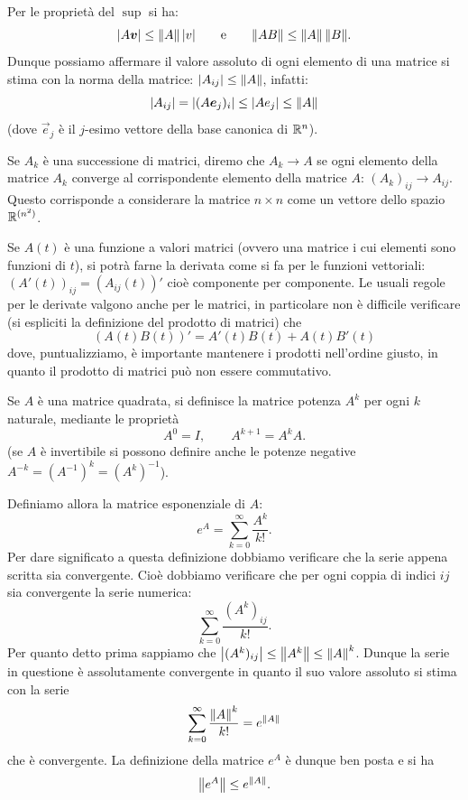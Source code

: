 Per le proprietà del $\sup$ si ha:
\[
  {\left|A\boldsymbol v\right|} \le {\left\Vert  A \right\Vert}\, {\left| v \right|}
\qquad\text{e}\qquad
  {\left\Vert  A B \right\Vert} \le {\left\Vert  A \right\Vert} \, {\left\Vert  B \right\Vert}.
\]
Dunque possiamo affermare il valore assoluto di ogni elemento di una
matrice si stima con la norma della matrice: ${\left| A_{ij}\right|} \le
{\left\Vert  A \right\Vert}$, infatti:
\[
  {\left| A_{ij} \right|} = {\left| (A \boldsymbol e_j)_i\right|} \le {\left| A e_j\right|}
  \le {\left\Vert  A \right\Vert}
\]
(dove $\vec e_j$ è il $j$-esimo vettore della base canonica di ${\mathbb R}^n$).

Se $A_k$ è una successione di matrici, diremo che $A_k\to A$ se ogni
elemento della matrice $A_k$ converge al corrispondente elemento della
matrice $A$: $(A_k)_{ij} \to A_{ij}$. Questo corrisponde a considerare
la matrice $n\times n$ come un vettore dello spazio ${\mathbb R}^{(n^2)}$.

Se $A(t)$ è una funzione a valori matrici (ovvero una matrice i cui
elementi sono funzioni di $t$), si potrà farne la derivata
come si fa per le funzioni vettoriali: $(A'(t))_{ij} = (A_{ij}(t))'$
cioè componente per componente. Le usuali regole per le derivate
valgono anche per le matrici, in particolare non è difficile
verificare (si espliciti la definizione del prodotto di matrici) che
\[
 (A(t)B(t))' = A'(t) B(t) + A(t) B'(t)
\]
dove, puntualizziamo, è importante mantenere i prodotti nell'ordine
giusto, in quanto il prodotto di matrici può non essere commutativo.

Se $A$ è una matrice quadrata, si definisce la matrice potenza $A^k$
per ogni $k$ naturale, mediante le proprietà
\[
  A^0 = I, \qquad A^{k+1} = A^kA.
\]
(se $A$ è invertibile si possono definire anche le potenze negative
$A^{-k}=(A^{-1})^k = (A^k)^{-1}$).

Definiamo allora la matrice esponenziale di $A$:
\[
  e^A = \sum_{k=0}^\infty \frac{A^k}{k!}.
\]
Per dare significato a questa definizione dobbiamo verificare che la
serie appena scritta sia convergente. Cioè dobbiamo verificare che per
ogni coppia di indici $ij$ sia convergente la serie numerica:
\[
 \sum_{k=0}^\infty \frac{(A^k)_{ij}}{k!}.
\]
Per quanto detto prima sappiamo che
${\left|(A^k)_{ij}\right|} \le {\left\Vert A^k\right\Vert} \le {\left\Vert A\right\Vert}^k$.
Dunque la serie in questione è
assolutamente convergente in quanto il suo valore assoluto si stima
con la serie
\[
 \sum_{k=0}^\infty \frac{{\left\Vert  A\right\Vert}^k}{k!} = e^{{\left\Vert  A\right\Vert}}
\]
che è convergente. La definizione della matrice $e^A$ è dunque
ben posta e si ha
\[
 {\left\Vert  e^A\right\Vert} \le e^{{\left\Vert  A \right\Vert}}.
\]

